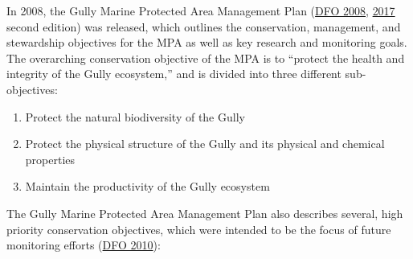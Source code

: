 \documentclass[12pt]{article}\usepackage[]{graphicx}\usepackage[]{color}
\begin{document}
In 2008, the Gully Marine Protected Area Management Plan (\protect\hyperlink{ref-dfo_2008}{DFO 2008}, \protect\hyperlink{ref-dfo_2017}{2017} second edition) was released, which outlines the conservation, management, and stewardship objectives for the MPA as well as key research and monitoring goals. The overarching conservation objective of the MPA is to ``protect the health and integrity of the Gully ecosystem,'' and is divided into three different sub-objectives:
\begin{enumerate}
\def\labelenumi{\arabic{enumi})}
\item
  Protect the natural biodiversity of the Gully
\item
  Protect the physical structure of the Gully and its physical and chemical properties
\item
  Maintain the productivity of the Gully ecosystem
\end{enumerate}
The Gully Marine Protected Area Management Plan also describes several, high priority conservation objectives, which were intended to be the focus of future monitoring efforts (\protect\hyperlink{ref-dfo_2010}{DFO 2010}):
\end{document}
